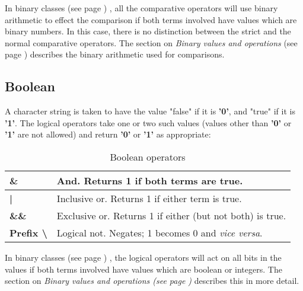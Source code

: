 In  binary classes (see page \pageref{refbincla}) , all the comparative operators
will use binary arithmetic to effect the comparison if both terms
involved have values which are binary numbers.
In this case, there is no distinction between the strict and the normal
comparative operators.
The section on  \emph{Binary values and operations} (see page \pageref{refbinary}) 
describes the binary arithmetic used for comparisons.
\subsection{Boolean}
\index{,}
A character string is taken to have the value "false" if it
is \textbf{'0'}, and "true" if it is \textbf{'1'}.
The logical operators take one or two such values (values other
than \textbf{'0'} or \textbf{'1'} are not allowed) and
return \textbf{'0'} or \textbf{'1'} as appropriate:
\begin{table}\caption{Boolean operators}
\begin{tabularx}{\textwidth}{>{\bfseries}lX}
\toprule
\&&And. Returns 1 if both terms are true.
\\\midrule
|&Inclusive or. Returns 1 if either term is true.
\\\midrule
\&\&&Exclusive or. Returns 1 if either (but not both) is true.
\\\midrule
Prefix \textbackslash &Logical not. Negates; 1 becomes 0 and
\emph{vice versa}.
\\\bottomrule
\end{tabularx}
\end{table}
In  binary classes (see page \pageref{refbincla}) , the logical operators will act on
all bits in the values if both terms involved have values which are
boolean or integers.
The section on  \emph{Binary values and operations (see page
  \pageref{refbinary})} describes this in more detail.
